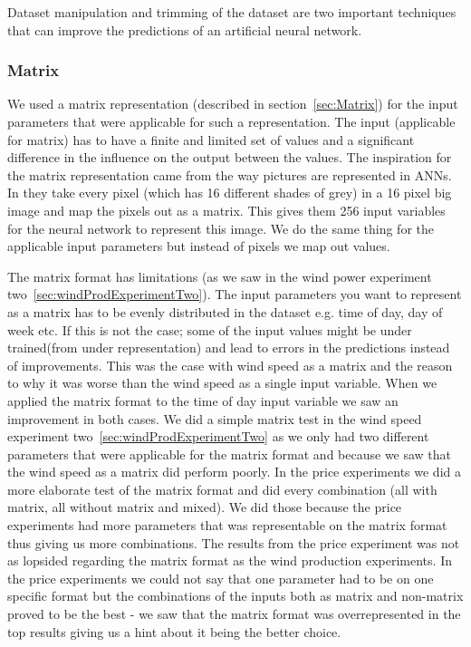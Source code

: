 Dataset manipulation and trimming of the dataset are two important techniques that can improve the predictions of an artificial neural network.
\subsubsection{Matrix}
We used a matrix representation (described in section~\ref{sec:Matrix}) for the input parameters that were applicable for such a representation. The input (applicable for matrix) has to have a finite and limited set of values and a significant difference in the influence on the output between the values. The inspiration for the matrix representation came from the way pictures are represented in ANNs. In \cite{knerr1992handwritten} they take every pixel (which has 16 different shades of grey) in a 16 pixel big image and map the pixels out as a matrix. This gives them 256 input variables for the neural network to represent this image. We do the same thing for the applicable input parameters but instead of pixels we map out values.

The matrix format has limitations (as we saw in the wind power experiment two~\ref{sec:windProdExperimentTwo}). The input parameters you want to represent as a matrix has to be evenly distributed in the dataset e.g. time of day, day of week etc. If this is not the case; some of the input values might be under trained(from under representation) and lead to errors in the predictions instead of improvements. This was the case with wind speed as a matrix and the reason to why it was worse than the wind speed as a single input variable. When we applied the matrix format to the time of day input variable we saw an improvement in both cases. We did a simple matrix test in the wind speed experiment two~\ref{sec:windProdExperimentTwo} as we only had two different parameters that were applicable for the matrix format and because we saw that the wind speed as a matrix did perform poorly. In the price experiments we did a more elaborate test of the matrix format and did every combination (all with matrix, all without matrix and mixed). We did those because the price experiments had more parameters that was representable on the matrix format thus giving us more combinations. The results from the price experiment was not as lopsided regarding the matrix format as the wind production experiments. In the price experiments we could not say that one parameter had to be on one specific format but the combinations of the inputs both as matrix and non-matrix proved to be the best - we saw that the matrix format was overrepresented in the top results giving us a hint about it being the better choice.

